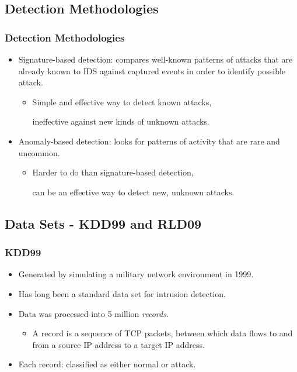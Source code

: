 \documentclass{beamer}
\newcommand{\linespace}{\vskip 0.25cm}
\begin{document}
\subsection{Detection Methodologies}
\begin{frame}
  \frametitle{Detection Methodologies}
  \begin{itemize}
  	\item Signature-based detection: compares well-known patterns of attacks
that are already known to IDS against captured events in order to identify possible attack.
	\begin{itemize}
		\item Simple and effective way to detect known attacks, 
		
		ineffective against new kinds of unknown attacks.
	\end{itemize}

\linespace
\linespace
\linespace

  	\item Anomaly-based detection: looks for patterns of activity that are rare and uncommon.
	\begin{itemize}
		\item Harder to do than signature-based detection, 
		
		can be an effective way to detect new, unknown attacks.
	\end{itemize}
  \end{itemize}
\end{frame}


\subsection{Data Sets - KDD99 and RLD09}
\begin{frame}
  \frametitle{KDD99}
	\begin{itemize}
		\item Generated by simulating a military network environment in 1999.
		\item Has long been a standard data set for intrusion detection.
		
\linespace		
		
		\item Data was processed into 5 million \emph{records}.
			\begin{itemize}
				\item A record is a sequence of TCP packets, between which data flows to and from a source IP address to a target IP address.
			\end{itemize}
		\item Each record: classified as either normal or attack.
	\end{itemize}
\end{frame}
\end{document}
